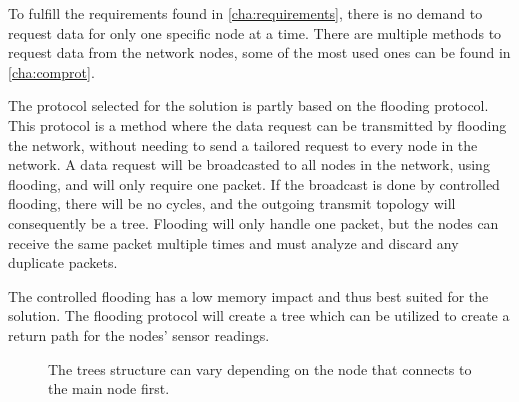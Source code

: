 To fulfill the requirements found in \ref{cha:requirements}, there is no demand to request data for only one specific node at a time.
There are multiple methods to request data from the network nodes, some of the most used ones can be found in \ref{cha:comprot}. 

The protocol selected for the solution is partly based on the flooding protocol.
This protocol is a method where the data request can be transmitted by flooding the network, without needing to send a tailored request to every node in the network. 
A data request will be broadcasted to all nodes in the network, using flooding, and will only require one packet. 
If the broadcast is done by controlled flooding, there will be no cycles, and the outgoing transmit topology will consequently be a tree. 
Flooding will only handle one packet, but the nodes can receive the same packet multiple times and must analyze and discard any duplicate packets.

The controlled flooding has a low memory impact and thus best suited for the solution. The flooding protocol will create a tree which can be utilized to create a return path for the nodes' sensor readings.

\begin{figure}[h!]
	\centering
	\caption{The trees structure can vary depending on the node that connects to the main node first.}
	\label{fig:treeVariation}
\end{figure}

